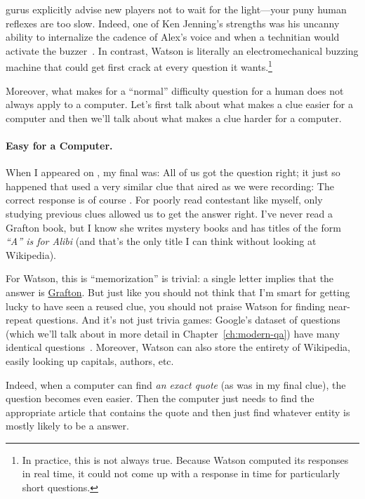 \jeopardy{} gurus explicitly advise new players not to wait for the light---your puny human reflexes are too slow.
%
Indeed, one of Ken Jenning's strengths was his uncanny ability to
internalize the cadence of Alex's voice and when a technitian would
activate the buzzer~\citep{jennings-06}.
%
In contrast, Watson is literally an electromechanical buzzing machine
that could get first crack at every question it wants.\footnote{In
practice, this is not always true.  Because Watson computed its
responses in real time, it could not come up with a response in time
for particularly short questions.}

Moreover, what makes for a ``normal'' difficulty question for a human
does not always apply to a computer.
%
Let's first talk about what makes a clue easier for a computer and
then we'll talk about what makes a clue harder for a computer.

\paragraph{Easy for a Computer.}

When I appeared on \jeopardyp{}, my final \jeopardy{} was:
%
All of us got the question right; it just so happened that \jeopardy{}
used a very similar clue that aired as we were recording:
%
%
The correct response is of course .
%
For poorly read contestant like myself, only studying previous clues
allowed us to get the answer right.
%
I've never read a Grafton book, but I know she writes mystery books and
has titles of the form \textit{``A'' is for Alibi} (and that's the
only title I can think without looking at Wikipedia).

For Watson, this is ``memorization'' is trivial: a single letter
implies that the answer is \underline{Grafton}.
%
But just like you should not think that I'm smart for getting lucky to
have seen a reused clue, you should not praise Watson for finding
near-repeat questions.
%
And it's not just trivia games: Google's dataset of questions (which
we'll talk about in more detail in Chapter~\ref{ch:modern-qa}) have
many identical questions~\citep{lewis-21}.
%
Moreover, Watson can also store the entirety of Wikipedia, easily
looking up capitals, authors, etc.

Indeed, when a computer can find \emph{an exact quote} (as was in my
final \jeopardy{} clue), the question becomes even easier.
%
Then the computer just needs to find the appropriate article that
contains the quote and then just find whatever entity is mostly likely
to be a \jeopardyp{} answer.


